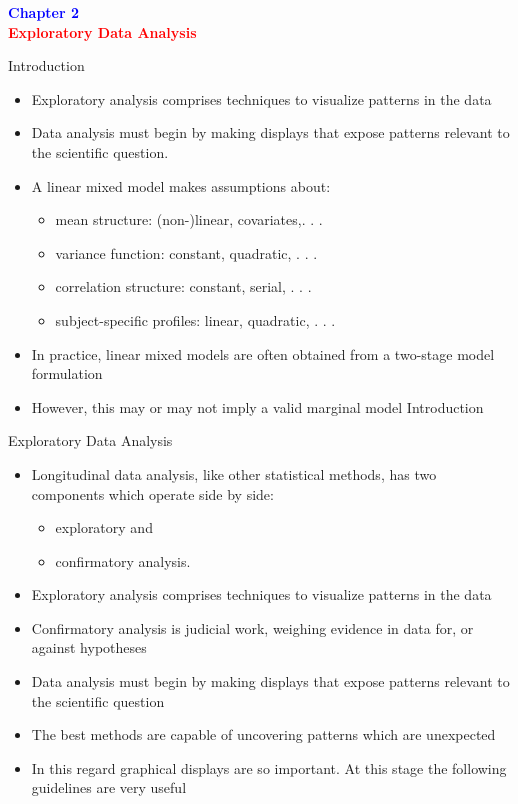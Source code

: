 \documentclass{beamer}
\begin{document}

\begin{frame}
\centering
\Large
\textbf{\textcolor{blue} {Chapter 2}}\\
\vspace*{3mm}
\textbf{\textcolor{red} {Exploratory Data Analysis}}
\end{frame}

\begin{frame}{Introduction}
\begin{itemize}
\item Exploratory analysis comprises techniques to visualize patterns in the data
\item Data analysis must begin by making displays that expose patterns relevant to the scientific question.
\item A linear mixed model makes assumptions about:
\begin{itemize}
	\item mean structure: (non-)linear, covariates,. . .
	\item variance function: constant, quadratic, . . .
	\item correlation structure: constant, serial, . . .
	\item subject-specific profiles: linear, quadratic, . . .
\end{itemize}
\item  In practice, linear mixed models are often obtained from a two-stage model formulation
\item However, this may or may not imply a valid marginal model Introduction
\end{itemize}
\end{frame}

\begin{frame}{Exploratory Data Analysis}
\begin{itemize}
	\item Longitudinal data analysis, like other statistical methods, has two components which operate side by side:
	\begin{itemize}
		\item exploratory and 
		\item confirmatory analysis.
	\end{itemize}
	\item Exploratory analysis comprises techniques to visualize patterns in the data
	\item Confirmatory analysis is judicial work, weighing evidence in data for, or against hypotheses
	\item Data analysis must begin by making displays that expose patterns relevant to the scientific question
	\item The best methods are capable of uncovering patterns which are unexpected
	\item In this regard graphical displays are so important. At this stage the following guidelines
	are very useful
\end{itemize}
\end{frame}
\end{document}
